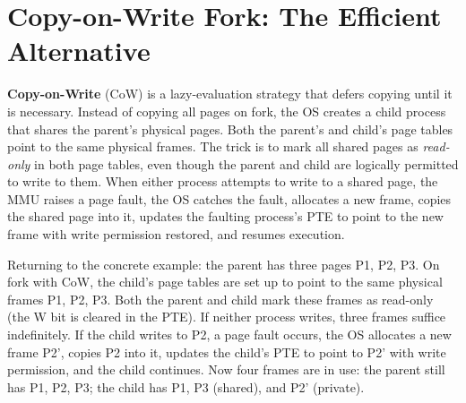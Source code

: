 \documentclass[11pt]{article}
\begin{document}
\section{Copy-on-Write Fork: The Efficient Alternative}

\textbf{Copy-on-Write} (CoW) is a lazy-evaluation strategy that defers copying until it is necessary. Instead of copying all pages on fork, the OS creates a child process that shares the parent's physical pages. Both the parent's and child's page tables point to the same physical frames. The trick is to mark all shared pages as \emph{read-only} in both page tables, even though the parent and child are logically permitted to write to them. When either process attempts to write to a shared page, the MMU raises a page fault, the OS catches the fault, allocates a new frame, copies the shared page into it, updates the faulting process's PTE to point to the new frame with write permission restored, and resumes execution.

Returning to the concrete example: the parent has three pages P1, P2, P3. On fork with CoW, the child's page tables are set up to point to the same physical frames P1, P2, P3. Both the parent and child mark these frames as read-only (the W bit is cleared in the PTE). If neither process writes, three frames suffice indefinitely. If the child writes to P2, a page fault occurs, the OS allocates a new frame P2', copies P2 into it, updates the child's PTE to point to P2' with write permission, and the child continues. Now four frames are in use: the parent still has P1, P2, P3; the child has P1, P3 (shared), and P2' (private).
\end{document}
